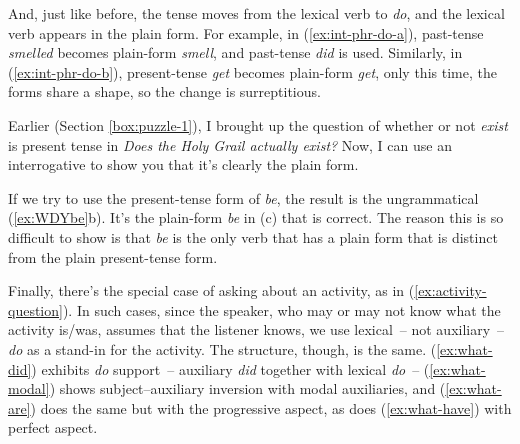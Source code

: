 And, just like before, the tense moves from the lexical verb to \textit{do}, and the lexical verb appears in the plain form. For example, in (\ref{ex:int-phr-do-a}), past-tense \textit{smelled} becomes plain-form \textit{smell}, and past-tense \textit{did} is used. Similarly, in (\ref{ex:int-phr-do-b}), present-tense \textit{get} becomes plain-form \textit{get}, only this time, the forms share a shape, so the change is surreptitious.


\begin{tcolorbox}[title=A verb-form puzzle, colback=white, parbox] \label{box:puzzle-2}
\setlength{\parindent}{1.5em}
    \noindent 
Earlier (Section \ref{box:puzzle-1}), I brought up the question of whether or not \textit{exist} is present tense in \textit{Does the Holy Grail actually exist?} Now, I can use an interrogative to show you that it's clearly the plain form.

\ea \label{ex:WDYbe}
    \z
\z

If we try to use the present-tense form of \textit{be}, the result is the ungrammatical (\ref{ex:WDYbe}b). It's the plain-form \textit{be} in (c) that is correct. The reason this is so difficult to show is that \textit{be} is the only verb that has a plain form that is distinct from the plain present-tense form.

\end{tcolorbox}


Finally, there's the special case of asking about an activity, as in (\ref{ex:activity-question}). In such cases, since the speaker, who may or may not know what the activity is/was, assumes that the listener knows, we use lexical~-- not auxiliary~-- \textit{do} as a stand-in for the activity. The structure, though, is the same. (\ref{ex:what-did}) exhibits \textit{do} support~-- auxiliary \textit{did} together with lexical \textit{do}~-- (\ref{ex:what-modal}) shows subject--auxiliary inversion with modal auxiliaries, and (\ref{ex:what-are}) does the same but with the progressive aspect, as does (\ref{ex:what-have}) with perfect aspect.

\ea\label{ex:activity-question}
    \label{ex:what-did}
    \label{ex:what-modal}
    \label{ex:what-are}
    \label{ex:what-have}
    \z
\z

